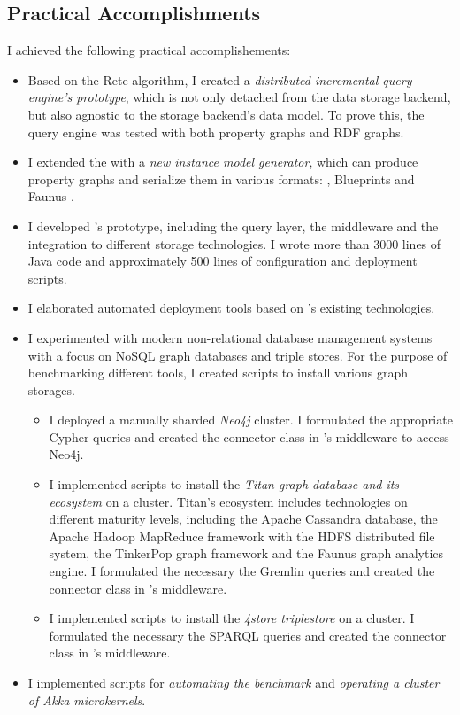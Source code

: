 \subsection{Practical Accomplishments}

I achieved the following practical accomplishements:

\begin{itemize}
  \item Based on the Rete algorithm, I created a \emph{distributed incremental query engine's prototype}, which is not only detached from the data storage backend, but also agnostic to the storage backend's data model. To prove this, the query engine was tested with both property graphs and RDF graphs.
  \item I extended the \tb{} with a \emph{new instance model generator}, which can produce property graphs and serialize them in various formats: \graphml{}, Blueprints \graphson{} and Faunus \graphson{}.
  \item I developed \iqd{}'s prototype, including the query layer, the middleware and the integration to different storage technologies. I wrote more than 3000 lines of Java code and approximately 500 lines of configuration and deployment scripts.
  \item I elaborated automated deployment tools based on \eiq{}'s existing technologies.
  \item I experimented with modern non-relational database management systems with a focus on NoSQL graph databases and triple stores. For the purpose of benchmarking different tools, I created scripts to install various graph storages. 
  \begin{itemize}
    \item I deployed a manually sharded \emph{Neo4j} cluster. I formulated the appropriate Cypher queries and created the connector class in \iqd{}'s middleware to access Neo4j.
    \item I implemented scripts to install the \emph{Titan graph database and its ecosystem} on a cluster. Titan's ecosystem includes technologies on different maturity levels, including the Apache Cassandra database, the Apache Hadoop MapReduce framework with the HDFS distributed file system, the TinkerPop graph framework and the Faunus graph analytics engine. I formulated the necessary the Gremlin queries and created the connector class in \iqd{}'s middleware.
    \item I implemented scripts to install the \emph{4store triplestore} on a cluster. I formulated the necessary the SPARQL queries and created the connector class in \iqd{}'s middleware. 
  \end{itemize}
  \item I implemented scripts for \emph{automating the benchmark} and \emph{operating a cluster of Akka microkernels}.
\end{itemize}

